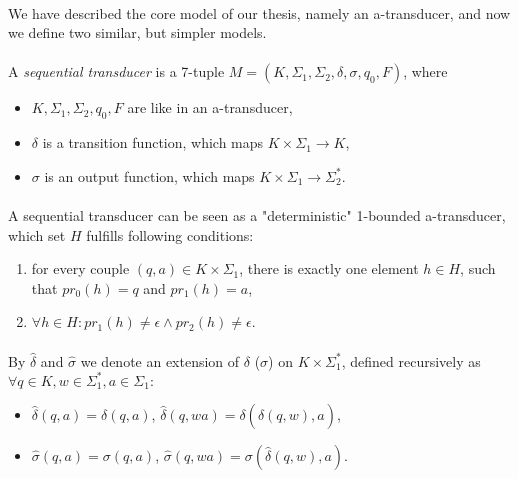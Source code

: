 \paragraph{}
We have described the core model of our thesis, namely an a-transducer, and now we define two similar, but simpler models.

\paragraph{}
 A \emph{sequential transducer} is a 7-tuple $M=(K, \Sigma_{1}, \Sigma_{2}, \delta, \sigma, q_{0}, F)$, where
\begin{itemize} 
\item $K, \Sigma_{1}, \Sigma_{2}, q_{0}, F$ are like in an a-transducer,
\item $\delta $ is a transition function, which maps $K \times \Sigma_{1} \rightarrow K$,
\item $\sigma $ is an output function, which maps $K \times \Sigma_{1} \rightarrow \Sigma_{2}^{*} $.
\end{itemize}

\paragraph{} 
A sequential transducer can be seen as a "deterministic" 1-bounded a-transducer, which set $H$ fulfills following conditions:
\begin{enumerate}
\item for every couple $(q, a) \in K \times \Sigma_{1}$, there is exactly one element $h \in H$, such that $pr_{0}(h) = q$ and $pr_{1}(h) = a$,
\item $\forall h \in H: pr_{1}(h) \neq \epsilon \wedge pr_{2}(h) \neq \epsilon $.
\end{enumerate}

\paragraph{}
\oznacenie By $\hat{\delta}$ and $\hat{\sigma}$ we denote an extension of $\delta $ ($\sigma $) on $K \times \Sigma_{1}^{*} $, defined recursively as \\
$\forall q \in K, w \in \Sigma_{1}^{*}, a \in \Sigma_{1}:$ \\
\begin{itemize} 
\item $\hat{\delta}(q, a) = \delta (q,a)$, $\hat{\delta}(q,wa) = \delta (\hat{\delta}(q, w), a)$,
\item $\hat{\sigma}(q, a) = \sigma (q,a)$, $\hat{\sigma}(q,wa) = \sigma (\hat{\delta}(q, w), a)$.
\end{itemize}

